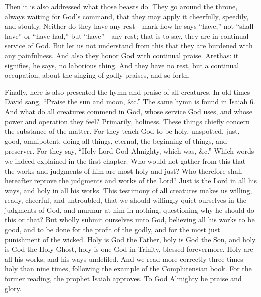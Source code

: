 Then it is also addressed what those beasts do. They go around the throne, always waiting for God’s command, that they may apply it cheerfully, speedily, and stoutly. Neither do they have any rest—mark how he says “have,” not “shall have” or “have had,” but “have”—any rest; that is to say, they are in continual service of God. But let us not understand from this that they are burdened with any painfulness. And also they honor God with continual praise. Arethas: it signifies, he says, no laborious thing. And they have no rest, but a continual occupation, about the singing of godly praises, and so forth.

Finally, here is also presented the hymn and praise of all creatures. In old times David sang, “Praise the sun and moon, \&c.” The same hymn is found in Isaiah 6. And what do all creatures commend in God, whose service God uses, and whose power and operation they feel? Primarily, holiness. These things chiefly concern the substance of the matter. For they teach God to be holy, unspotted, just, good, omnipotent, doing all things, eternal, the beginning of things, and preserver. For they say, “Holy Lord God Almighty, which was, \&c.” Which words we indeed explained in the first chapter. Who would not gather from this that the works and judgments of him are most holy and just? Who therefore shall hereafter reprove the judgments and works of the Lord? Just is the Lord in all his ways, and holy in all his works. This testimony of all creatures makes us willing, ready, cheerful, and untroubled, that we should willingly quiet ourselves in the judgments of God, and murmur at him in nothing, questioning why he should do this or that? But wholly submit ourselves unto God, believing all his works to be good, and to be done for the profit of the godly, and for the most just punishment of the wicked. Holy is God the Father, holy is God the Son, and holy is God the Holy Ghost, holy is one God in Trinity, blessed forevermore. Holy are all his works, and his ways undefiled. And we read more correctly three times holy than nine times, following the example of the Complutensian book. For the former reading, the prophet Isaiah approves. To God Almighty be praise and glory.
